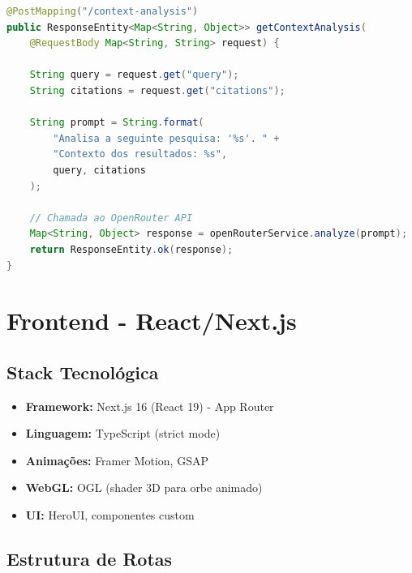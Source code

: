 \documentclass[12pt,a4paper]{article}
\begin{document}
\begin{lstlisting}[language=Java, caption={ContextAnalysisController.java}]
@PostMapping("/context-analysis")
public ResponseEntity<Map<String, Object>> getContextAnalysis(
    @RequestBody Map<String, String> request) {
    
    String query = request.get("query");
    String citations = request.get("citations");
    
    String prompt = String.format(
        "Analisa a seguinte pesquisa: '%s'. " +
        "Contexto dos resultados: %s", 
        query, citations
    );
    
    // Chamada ao OpenRouter API
    Map<String, Object> response = openRouterService.analyze(prompt);
    return ResponseEntity.ok(response);
}
\end{lstlisting}

\newpage

\section{Frontend - React/Next.js}

\subsection{Stack Tecnológica}

\begin{itemize}
    \item \textbf{Framework:} Next.js 16 (React 19) - App Router
    \item \textbf{Linguagem:} TypeScript (strict mode)
    \item \textbf{Animações:} Framer Motion, GSAP
    \item \textbf{WebGL:} OGL (shader 3D para orbe animado)
    \item \textbf{UI:} HeroUI, componentes custom
\end{itemize}

\subsection{Estrutura de Rotas}
\end{document}
